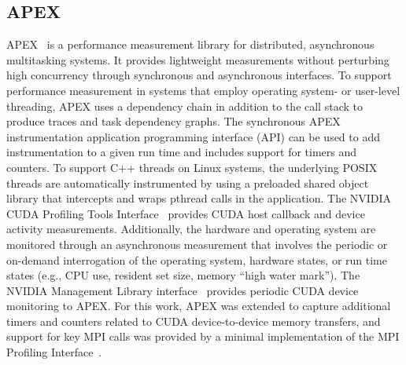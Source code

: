 \subsection{APEX}
APEX~\cite{huck2015autonomic} is a 
performance measurement library for distributed, asynchronous multitasking 
systems. It provides lightweight measurements without perturbing high
concurrency through synchronous and asynchronous interfaces.
To support performance measurement in systems that employ operating system- or user-level 
threading, APEX uses a dependency chain in addition to the call stack to
produce traces and task dependency graphs. 
The synchronous APEX instrumentation application programming interface (API) can be used to add instrumentation to a given
run time and includes support for timers and counters.  To support C++ threads
on Linux systems, the underlying POSIX threads are
automatically instrumented by using a preloaded shared object library that intercepts and wraps
pthread calls in the application. The NVIDIA CUDA Profiling Tools Interface~\cite{cuptiweb} provides CUDA host callback and device activity measurements.
Additionally, the hardware and operating system are monitored through an asynchronous measurement that involves the periodic or on-demand interrogation of the operating system, hardware states, or run time states (e.g., CPU use, 
resident set size, memory ``high water mark''). The NVIDIA Management Library interface~\cite{nvmlweb} provides periodic CUDA device monitoring to APEX.  For this work, APEX was 
extended to capture additional timers and counters related to CUDA device-to-device memory transfers, and support for key MPI calls was provided by
a minimal implementation of the MPI Profiling 
Interface~\cite{MPIbook}.

